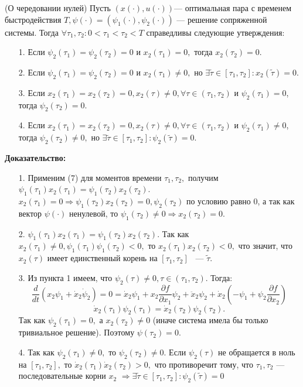 \documentclass{article}
\theoremstyle{definition}
\begin{document}
 
 	\begin{theorem}
 		{(О чередовании нулей) Пусть $(x(\cdot), u(\cdot))$--- оптимальная пара с временем быстродействия $T, \psi(\cdot)=(\psi_1(\cdot),\psi_2(\cdot))$ --- решение сопряженной системы. Тогда $\forall \tau_1, \tau_2: 0 < \tau_1 < \tau_2 < T$ справедливы следующие утверждения:}
 		\begin{itemize}
 			\item [1.]{Если $\psi_2(\tau_1)=\psi_2(\tau_2)=0$ и $x_2(\tau_1)=0,$ тогда $x_2(\tau_2)=0.$}
 			\item [2.]{Если $\psi_2(\tau_1)=\psi_2(\tau_2)=0$ и $x_2(\tau_1)\neq 0,$ но $\exists \tilde{\tau} \in [\tau_1, \tau_2]:x_2(\tilde{\tau})=0. $}
 			\item [3.]{Если $x_2(\tau_1) = x_2(\tau_2)=0, x_2(\tau) \neq 0, \forall \tau \in (\tau_1, \tau_2)$ и $\psi_2(\tau_1)=0$, тогда $\psi_2(\tau_2)=0.$}
 			\item [4.]{Если $x_2(\tau_1) = x_2(\tau_2)=0, x_2(\tau) \neq 0, \forall \tau \in (\tau_1, \tau_2)$ и $\psi_2(\tau_1)\neq0$, тогда $\psi_2(\tau_2)\neq0,$ но $\exists \tilde{\tau}\in [\tau_1, \tau_2]:\psi_2(\tilde{\tau})=0.$}
 		\end{itemize}
 	\end{theorem}
 	{\textbf{Доказательство:}}
 	\begin{itemize}
 		\item [1.]{Применим (7) для моментов времени $\tau_1,\tau_2,$ получим $\psi_1(\tau_1)x_2(\tau_1)=\psi_1(\tau_2)x_2(\tau_2).$ $x_2(\tau_1)=0 \Rightarrow \psi_1(\tau_2)x_2(\tau_2) = 0,\psi_2(\tau_2)$ по условию равно 0, а так как вектор $\psi(\cdot)$ ненулевой, то $\psi_1(\tau_2) \neq 0 \Rightarrow x_2(\tau_2) = 0.$}
 		\item [2.]{$\psi_1(\tau_1)x_2(\tau_1) = \psi_1(\tau_2)x_2(\tau_2).$ Так как $x_2(\tau_1) \neq 0, \psi_1(\tau_1)\psi_1(\tau_2) < 0,$ то $x_2(\tau_1)x_2(\tau_2) < 0,$ что значит, что $x_2(\tau)$ имеет единственный корень на $[\tau_1,\tau_2]$ ~--- $\tilde{\tau}.$} 
 		\item [3.]{Из пункта 1 имеем, что $\psi_2(\tau) \neq 0, \tau \in (\tau_1, \tau_2).$ Тогда: 
 		\begin{equation}
 			 \frac{d}{dt}(x_2\psi_1 + \dot{x}_2\dot{\psi}_2) = 0 = \dot{x}_2\psi_1 + x_2\frac{\partial f}{\partial x_1}\psi_2 + \ddot{x}_2\psi_2 + \dot{x}_2(-\psi_1 + \psi_2\frac{\partial f}{\partial x_2})
 		\end{equation}
 		\begin{equation}
 			\dot{x}_2(\tau_1)\psi_2(\tau_1) = \dot{x}_2(\tau_2)\psi_2(\tau_2).
 		\end{equation}
 		Так как $\psi_2(\tau_1) = 0,$ а $x_2(\tau_2) \neq 0$ (иначе система имела бы только тривиальное решение). Поэтому $\psi(\tau_2) = 0.$
 	 }
 		\item [4.]{Так как $\psi_2(\tau_1) \neq 0,$ то $\psi_2(\tau_2) \neq 0.$ Если $\psi_2(\tau)$ не обращается в ноль на $[\tau_1, \tau_2],$ то $\dot{x}_2(\tau_1)\dot{x}_2(\tau_2) > 0,$ что противоречит тому, что $\tau_1, \tau_2$ --- последовательные корни $x_2$ $\Rightarrow \exists \tilde{\tau} \in [\tau_1, \tau_2]:\psi_2(\tilde{\tau}) = 0$ }
 	\end{itemize}
 	
\end{document}
